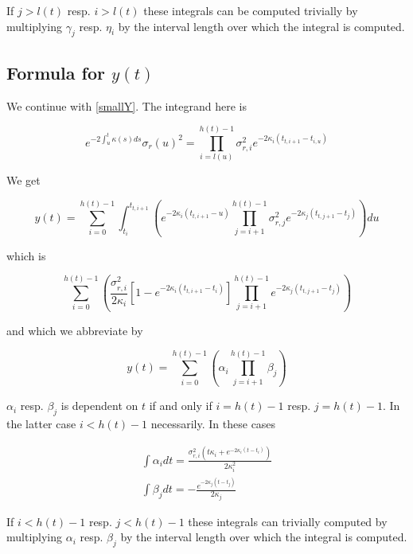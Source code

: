 \documentclass{amsart}
\theoremstyle{plain}
\numberwithin{equation}{section}
\begin{document}
If $j>l(t)$ resp. $i>l(t)$ these integrals can be computed trivially by multiplying $\gamma_j$ resp. $\eta_i$ by the interval length over which the integral is computed.

\subsection{Formula for $y(t)$}

We continue with \ref{smallY}. The integrand here is

\begin{equation}
e^{-2 \int_u^t \kappa(s) ds} \sigma_r(u)^2 = \prod_{i=l(u)}^{h(t)-1} \sigma_{r,i}^2 e^{-2\kappa_i(t_{t,i+1}-t_{i,u})}
\end{equation}

We get

\begin{equation}
y(t) = \sum_{i=0}^{h(t)-1} \int_{t_i}^{t_{t,i+1}} \left( e^{-2\kappa_i(t_{t,i+1}-u)} \prod_{j=i+1}^{h(t)-1} \sigma_{r,j}^2 e^{-2\kappa_j(t_{t,j+1}-t_j)} \right) du
\end{equation}

which is

\begin{equation}\label{explicitY}
\sum_{i=0}^{h(t)-1} \left( \frac{\sigma_ {r,i}^2}{2\kappa_i} \left[1-e^{-2\kappa_i(t_{t,i+1}-t_i)}\right] \prod_{j=i+1}^{h(t)-1} e^{-2\kappa_j(t_{t,j+1}-t_j)} \right)
\end{equation}

and which we abbreviate by

\begin{equation}
y(t) = \sum_{i=0}^{h(t)-1} \left( \alpha_i \prod_{j=i+1}^{h(t)-1} \beta_j \right)
\end{equation}

$\alpha_i$ resp. $\beta_j$ is dependent on $t$ if and only if $i=h(t)-1$ resp. $j=h(t)-1$. In the latter case $i<h(t)-1$ necessarily. In these cases

\begin{eqnarray}
\int \alpha_i dt = \frac{\sigma^2_{r,i}(t\kappa_i + e^{-2\kappa_i(t-t_i)})}{2\kappa_i^2}  \\
\int \beta_j dt = - \frac {e^{-2\kappa_j(t-t_j)}} {2\kappa_j} 
\end{eqnarray}

If $i<h(t)-1$ resp. $j<h(t)-1$ these integrals can trivially computed by multiplying $\alpha_i$ resp. $\beta_j$ by the interval length over which the 
integral is computed.
\end{document}
